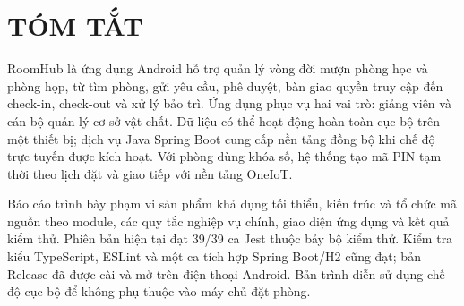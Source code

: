 \documentclass[a4paper,12pt,oneside]{report}
\begin{document}


\clearpage
{}
\setcounter{page}{2}
\pagestyle{plain}

\chapter*{TÓM TẮT}
RoomHub là ứng dụng Android hỗ trợ quản lý vòng đời mượn phòng học và phòng họp, từ tìm phòng, gửi yêu cầu, phê duyệt, bàn giao quyền truy cập đến check-in, check-out và xử lý bảo trì. Ứng dụng phục vụ hai vai trò: giảng viên và cán bộ quản lý cơ sở vật chất. Dữ liệu có thể hoạt động hoàn toàn cục bộ trên một thiết bị; dịch vụ Java Spring Boot cung cấp nền tảng đồng bộ khi chế độ trực tuyến được kích hoạt. Với phòng dùng khóa số, hệ thống tạo mã PIN tạm thời theo lịch đặt và giao tiếp với nền tảng OneIoT.

Báo cáo trình bày phạm vi sản phẩm khả dụng tối thiểu, kiến trúc và tổ chức mã nguồn theo module, các quy tắc nghiệp vụ chính, giao diện ứng dụng và kết quả kiểm thử. Phiên bản hiện tại đạt 39/39 ca Jest thuộc bảy bộ kiểm thử. Kiểm tra kiểu TypeScript, ESLint và một ca tích hợp Spring Boot/H2 cũng đạt; bản Release đã được cài và mở trên điện thoại Android. Bản trình diễn sử dụng chế độ cục bộ để không phụ thuộc vào máy chủ đặt phòng.

\clearpage
\renewcommand*\contentsname{MỤC LỤC}
\begingroup
{}
\tableofcontents
\endgroup

\clearpage
\renewcommand{\listfigurename}{DANH MỤC HÌNH VẼ}
\listoffigures

\clearpage
\renewcommand{\listtablename}{DANH MỤC BẢNG BIỂU}
\listoftables

\clearpage
\end{document}
